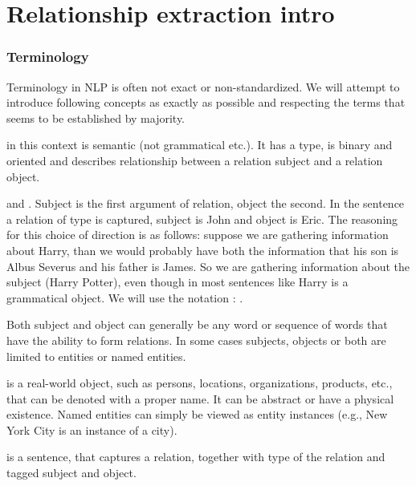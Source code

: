 \chapter{Relationship extraction intro} 

\subsection{Terminology}
Terminology in NLP is often not exact or non-standardized. We will attempt to introduce following concepts as exactly as possible and respecting the terms that seems to be established by majority.  

 in this context is semantic (not grammatical etc.). It has a type, is binary and oriented and describes relationship between a relation subject and a relation object.

 and . Subject is the first argument of relation, object the second. In the sentence  a relation of type is captured, subject is John and object is Eric. The reasoning for this choice of direction is as follows: suppose we are gathering information about Harry, than we would probably have both the information that his son is Albus Severus and his father is James. So we are gathering information about the subject (Harry Potter), even though in most sentences like   Harry is a grammatical object. We will use the notation : . 

Both subject and object can generally be any word or sequence of words that have the ability to form relations. In some cases subjects, objects or both are limited to entities or named entities. 

   is a real-world object, such as persons, locations, organizations, products, etc., that can be denoted with a proper name. It can be abstract or have a physical existence. Named entities can simply be viewed as entity instances (e.g., New York City is an instance of a city).


 is a sentence, that captures a relation, together with type of the relation and tagged subject and object. 


 



